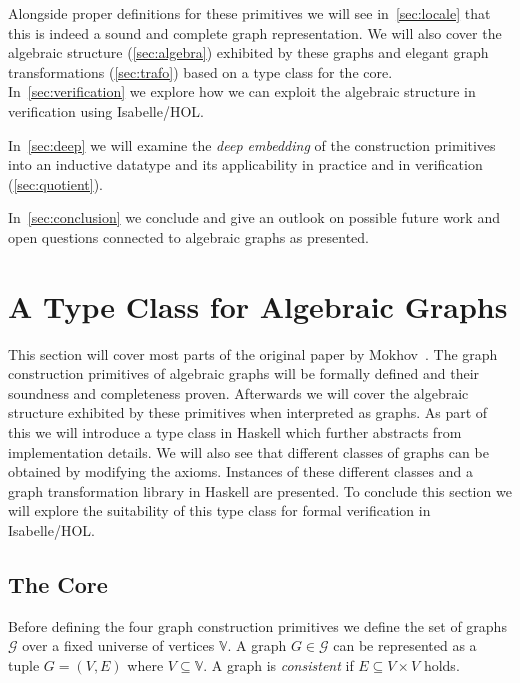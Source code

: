 \documentclass{article}
\begin{document}
Alongside proper definitions for these primitives we will see
in~\autoref{sec:locale} that this is indeed a sound and complete graph
representation. We will also cover the algebraic structure (\ref{sec:algebra})
exhibited by these graphs and elegant graph transformations (\ref{sec:trafo})
based on a type class for the core. In~\autoref{sec:verification} we explore how
we can exploit the algebraic structure in verification using Isabelle/HOL.

In~\autoref{sec:deep} we will examine the \emph{deep embedding} of the construction
primitives into an inductive datatype and its
applicability in practice and in verification (\ref{sec:quotient}). 

In~\autoref{sec:conclusion} we conclude and give an outlook on possible future
work and open questions connected to algebraic graphs as presented.

\section{A Type Class for Algebraic Graphs}\label{sec:locale}
This section will cover most parts of the original paper by
Mokhov~\cite{mokhov2017algebraic}. The graph construction primitives of
algebraic graphs will be formally defined and their soundness and completeness
proven. Afterwards we will cover the algebraic structure exhibited by these
primitives when interpreted as graphs. As part of this we will introduce a type class in Haskell which
further abstracts from implementation details. We will also see that different
classes of graphs can be obtained by modifying the axioms. Instances of
these different classes and a graph transformation library in Haskell are
presented. To conclude this section we will explore the suitability of this type
class for formal verification in Isabelle/HOL.

\subsection{The Core}\label{sec:core}
Before defining the four graph construction primitives we define the set of
graphs $\mathcal{G}$ over a fixed universe of vertices $\mathbb{V}$. A graph $G
\in \mathcal{G}$ can be represented as a tuple $G=(V,E)$ where $V \subseteq
\mathbb{V}$. A graph is \emph{consistent} if $E \subseteq V \times V$ holds.
\end{document}
